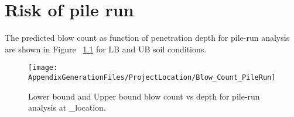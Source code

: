 \chapter{Risk of pile run}\label{sec_1}

The predicted blow count as function of penetration depth for pile-run analysis
are shown in Figure ~\ref{blow_count_PileRun} for LB and UB soil conditions.

\begin{figure}[!htbp]
\texttt{[image: AppendixGenerationFiles/ProjectLocation/Blow\_Count\_PileRun]}
\caption{Lower bound and Upper bound blow count vs depth for pile-run analysis at  {\ID_location}.}
\label{blow_count_PileRun}\end{figure}

\newpage


